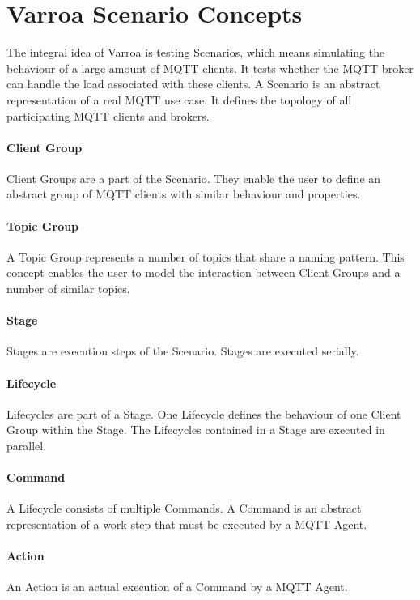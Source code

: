 \section{Varroa Scenario Concepts}
The integral idea of Varroa is testing Scenarios, which means simulating the behaviour of a large amount of MQTT clients.
It tests whether the MQTT broker can handle the load associated with these clients.
A Scenario is an abstract representation of a real MQTT use case.
It defines the topology of all participating MQTT clients and brokers.

\paragraph{Client Group}
Client Groups are a part of the Scenario.
They enable the user to define an abstract group of MQTT clients with similar behaviour and properties.

\paragraph{Topic Group}
A Topic Group represents a number of topics that share a naming pattern.
This concept enables the user to model the interaction between Client Groups and a number of similar topics.

\paragraph{Stage}
Stages are execution steps of the Scenario. Stages are executed serially.

\paragraph{Lifecycle}
Lifecycles are part of a Stage.
One Lifecycle defines the behaviour of one Client Group within the Stage.
The Lifecycles contained in a Stage are executed in parallel.

\paragraph{Command}
A Lifecycle consists of multiple Commands.
A Command is an abstract representation of a work step that must be executed by a MQTT Agent.

\paragraph{Action}
An Action is an actual execution of a Command by a MQTT Agent.

